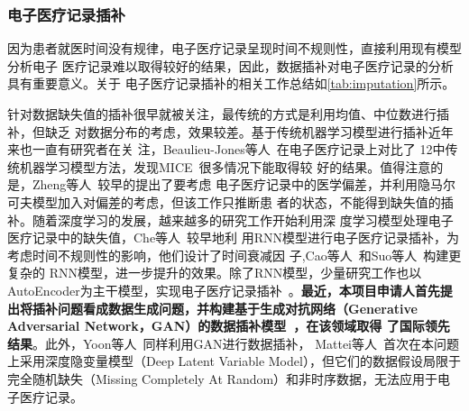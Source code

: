 {}

\subsubsection{电子医疗记录插补}

因为患者就医时间没有规律，电子医疗记录呈现时间不规则性，直接利用现有模型分析电子
医疗记录难以取得较好的结果，因此，数据插补对电子医疗记录的分析具有重要意义。关于
电子医疗记录插补的相关工作总结如\cref{tab:imputation}所示。

针对数据缺失值的插补很早就被关注，最传统的方式是利用均值、中位数进行插补，但缺乏
对数据分布的考虑，效果较差。基于传统机器学习模型进行插补近年来也一直有研究者在关
注，Beaulieu-Jones等人~在电子医疗记录上对比了
12中传统机器学习模型方法，发现MICE~很多情况下能取得较
好的结果。值得注意的是，Zheng等人~较早的提出了要考虑
电子医疗记录中的医学偏差，并利用隐马尔可夫模型加入对偏差的考虑，但该工作只推断患
者的状态，不能得到缺失值的插补。随着深度学习的发展，越来越多的研究工作开始利用深
度学习模型处理电子医疗记录中的缺失值，Che等人~较早地利
用RNN模型进行电子医疗记录插补，为考虑时间不规则性的影响，他们设计了时间衰减因
子,Cao等人~和Suo等人~构建更复杂的
RNN模型，进一步提升\cite{che2018recurrent}的效果。除了RNN模型，少量研究工作也以
AutoEncoder为主干模型，实现电子医疗记录插补~。\textbf{最近，本项目申请人首先提
出将插补问题看成数据生成问题，并构建基于生成对抗网络（Generative Adversarial
Network，GAN）的数据插补模型~，在该领域取得
了国际领先结果}。此外，Yoon等人~同样利用GAN进行数据插补，
Mattei等人~首次在本问题上采用深度隐变量模型（Deep Latent
Variable Model），但它们的数据假设局限于完全随机缺失（Missing Completely At
Random）和非时序数据，无法应用于电子医疗记录。

